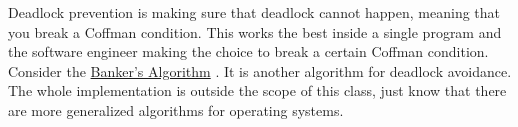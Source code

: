 Deadlock prevention is making sure that deadlock cannot happen, meaning that you break a Coffman condition.
This works the best inside a single program and the software engineer making the choice to break a certain Coffman condition. Consider the 
\href{https://en.wikipedia.org/wiki/Banker's\_algorithm}{Banker's Algorithm} \cite{Dijkstra:1965:CSP:1102034}.
It is another algorithm for deadlock avoidance.
The whole implementation is outside the scope of this class, just know that there are more generalized algorithms for operating systems.

